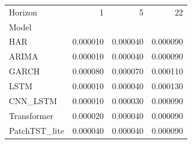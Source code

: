 \begin{tabular}{lrrr}
\toprule
Horizon & 1 & 5 & 22 \\
Model &  &  &  \\
\midrule
HAR & 0.000010 & 0.000040 & 0.000090 \\
ARIMA & 0.000010 & 0.000040 & 0.000090 \\
GARCH & 0.000080 & 0.000070 & 0.000110 \\
LSTM & 0.000010 & 0.000040 & 0.000130 \\
CNN_LSTM & 0.000010 & 0.000030 & 0.000090 \\
Transformer & 0.000020 & 0.000040 & 0.000090 \\
PatchTST_lite & 0.000040 & 0.000040 & 0.000090 \\
\bottomrule
\end{tabular}
